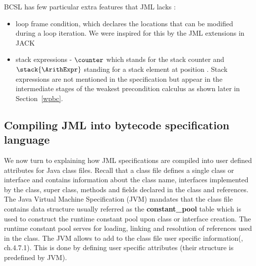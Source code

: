BCSL has few particular extra features that JML lacks :
\begin{itemize}
   \item loop frame condition, which declares the locations
that can be modified during a loop iteration. We were inspired for this by the JML extensions in JACK ~\cite{BRL-JACK}

   \item stack expressions - $\counter$ which stands for the stack counter and 
 $\stack{\ArithExpr}$ standing for a stack element at position 
\ArithExpr. Stack expressions are not mentioned in the specification but
 appear in the intermediate stages of the weakest precondition calculus as shown later in Section~\ref{wpbc}.




\end{itemize}



\subsection{Compiling JML into bytecode specification language}\label{comJML}


We now turn to explaining how JML specifications are compiled into user defined attributes for Java class files. Recall that a class file defines
a single class or interface and contains information about  the class name, interfaces implemented by the class, super class, methods and fields declared in the class and references. The Java Virtual Machine Specification (JVM) \cite{VMSpec} mandates that the class file contains data structure usually referred as the \textbf{constant\_pool} table which is used to construct the runtime constant pool upon class or interface creation. The runtime constant pool serves for loading, linking and resolution of references used in the class. The JVM allows to add to the class file user specific information(\cite{VMSpec}, ch.4.7.1). This is done by defining user specific attributes  (their structure is predefined by JVM).

